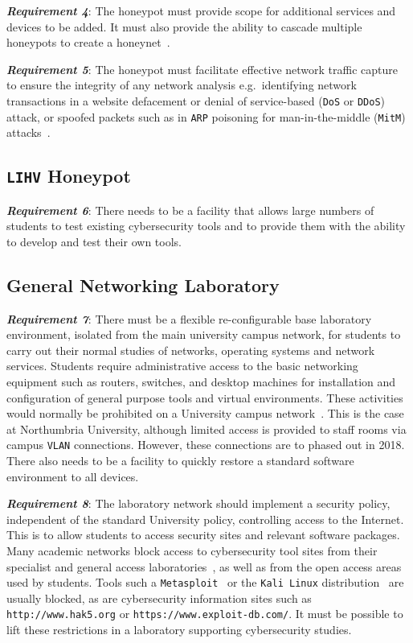 \documentclass{ieeeaccess}
\begin{document}
\noindent\textit{\textbf{Requirement 4}}:
The honeypot must provide scope for additional services and devices to be
added. It must also provide the ability to cascade multiple honeypots to create
a honeynet~\cite{AA:15,FDF:15,KNC:15}.

\noindent\textit{\textbf{Requirement 5}}:
The honeypot must facilitate effective network traffic capture to ensure the
integrity of any network analysis e.g.\ identifying network transactions in a
website defacement or denial of service-based (\texttt{DoS} or \texttt{DDoS})
attack, or spoofed packets such as in \texttt{ARP} poisoning for
man-in-the-middle (\texttt{MitM}) attacks~\cite{PS:16,RSKA:16}.

\subsection{\texttt{LIHV} Honeypot}\label{subsec:LabHoneypot}

\noindent\textit{\textbf{Requirement 6}}:
There needs to be a facility that allows large numbers of students to test
existing cybersecurity tools and to provide them with the ability to develop
and test their own tools.

\subsection{General Networking Laboratory}\label{subsec:GeneralLab}

\noindent\textit{\textbf{Requirement 7}}: There must be a flexible
re-configurable base laboratory environment, isolated from the main university
campus network, for students to carry out their normal studies of networks,
operating systems and network services. Students require administrative access
to the basic networking equipment such as routers, switches, and desktop
machines for installation and configuration of general purpose tools and
virtual environments. These activities would normally be prohibited on a
University campus network~\cite{MGDL:13}. This is the case at Northumbria
University, although limited access is provided to staff rooms via campus
\texttt{VLAN} connections. However, these connections are to phased out in
2018. There also needs to be a facility to quickly restore a standard software
environment to all devices.  

\noindent\textit{\textbf{Requirement 8}}: The laboratory network should
implement a security policy, independent of the standard University policy,
controlling access to the Internet. This is to allow students to access
security sites and relevant software packages. Many academic networks block
access to cybersecurity tool sites from their specialist and general access
laboratories~\cite{ACGO:06,YYLCHJ:04}, as well as from the open access areas
used by students. Tools such a \texttt{Metasploit}~\cite{R7:17} or the
\texttt{Kali Linux} distribution~\cite{OS:17} are usually blocked, as are
cybersecurity information sites such as \texttt{http://www.hak5.org} or
\texttt{https://www.exploit-db.com/}. It must be possible to lift these
restrictions in a laboratory supporting cybersecurity studies.
\end{document}

